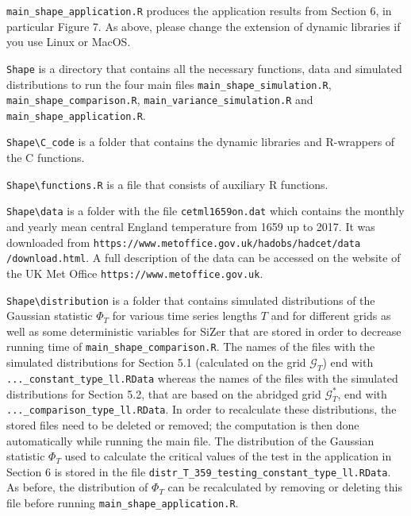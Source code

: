 \documentclass[a4paper,12pt]{article}
\begin{document}
\verb|main_shape_application.R| \hspace{1pt} produces the application results from Section 6, in particular Figure 7. As above, please change the extension of dynamic libraries if you use Linux or MacOS.

\verb|Shape| \hspace{1pt} is a directory that contains all the necessary functions, data and simulated distributions to run the four main files \verb|main_shape_simulation.R|, \verb|main_shape_comparison.R|, \verb|main_variance_simulation.R|  and \linebreak \verb|main_shape_application.R|.

\verb|Shape\C_code| \hspace{1pt} is a folder that contains the dynamic libraries and R-wrappers of the C functions.

\verb|Shape\functions.R| \hspace{1pt} is a file that consists of auxiliary R functions.

\verb|Shape\data| \hspace{1pt} is a folder with the file \verb|cetml1659on.dat| which contains the monthly and yearly mean central England temperature from 1659 up to 2017. It was downloaded from \verb|https://www.metoffice.gov.uk/hadobs/hadcet/data| \verb|/download.html|. A full description of the data can be accessed on the website of the UK Met Office \verb|https://www.metoffice.gov.uk|. 

\verb|Shape\distribution| \hspace{1pt} is a folder that  contains simulated distributions of the Gaussian statistic $\Phi_{T}$ for various time series lengths $T$ and for different grids as well as some deterministic variables for SiZer that are stored in order to decrease running time of \verb|main_shape_comparison.R|. The names of the files with the simulated distributions for Section 5.1 (calculated on the grid $\mathcal{G}_T$) end with \verb|..._constant_type_ll.RData| whereas the names of the files with the simulated distributions for Section 5.2, that are based on the abridged grid $\mathcal{G}^*_T$, end with \verb|..._comparison_type_ll.RData|. In order to recalculate these distributions, the stored files need to be deleted or removed; the computation is then done automatically while running the main file. The distribution of the Gaussian statistic $\Phi_T$ used to calculate the critical values of the test in the application in Section 6 is stored in the file \verb|distr_T_359_testing_constant_type_ll.RData|. As before, the distribution of $\Phi_T$ can be recalculated by removing or deleting this file before running \verb|main_shape_application.R|. 
\end{document}
